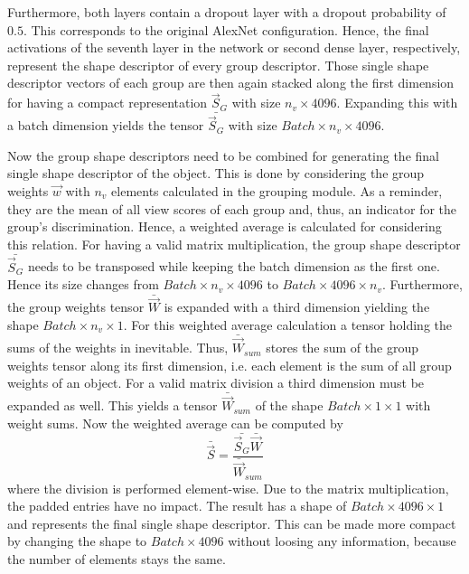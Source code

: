 Furthermore, both layers contain a dropout layer with a dropout probability of $0.5$.
This corresponds to the original AlexNet configuration.
Hence, the final activations of the seventh layer in the network or second dense layer, respectively, represent the shape descriptor of every group descriptor.
Those single shape descriptor vectors of each group are then again stacked along the first dimension for having a compact representation $\vec{S}_G$ with size $n_v \times 4096$.
Expanding this with a batch dimension yields the tensor $\bar{\vec{S}_G}$ with size $Batch \times n_v \times 4096$.

Now the group shape descriptors need to be combined for generating the final single shape descriptor of the object.
This is done by considering the group weights $\vec{w}$ with $n_v$ elements calculated in the grouping module.
As a reminder, they are the mean of all view scores of each group and, thus, an indicator for the group's discrimination.
Hence, a weighted average is calculated for considering this relation.
For having a valid matrix multiplication, the group shape descriptor $\bar{\vec{S}_G}$ needs to be transposed while keeping the batch dimension as the first one.
Hence its size changes from $Batch \times n_v \times 4096$ to $Batch \times 4096 \times n_v$.
Furthermore, the group weights tensor $\bar{\vec{W}}$ is expanded with a third dimension yielding the shape $Batch \times n_v \times 1$.
For this weighted average calculation a tensor holding the sums of the weights in inevitable.
Thus, $\bar{\vec{W}}_{sum}$ stores the sum of the group weights tensor along its first dimension, i.e. each element is the sum of all group weights of an object.
For a valid matrix division a third dimension must be expanded as well.
This yields a tensor $\bar{\vec{W}}_{sum}$ of the shape $Batch \times 1 \times 1$ with weight sums.
Now the weighted average can be computed by
\begin{equation}
	\bar{\vec{S}} = \frac{\bar{\vec{S}_G} \bar{\vec{W}}}{\bar{\vec{W}}_{sum}}
\end{equation}
where the division is performed element-wise.
Due to the matrix multiplication, the padded entries have no impact.
The result has a shape of $Batch \times 4096 \times 1$ and represents the final single shape descriptor.
This can be made more compact by changing the shape to $Batch \times 4096$ without loosing any information, because the number of elements stays the same.

